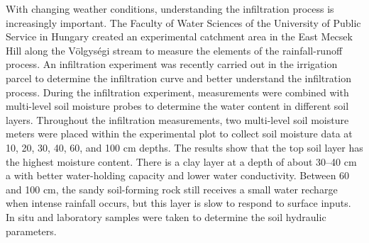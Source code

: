 

\newpage{}
{}
\begin{flushleft}







\end{flushleft}

\noindent

With changing weather conditions, understanding the infiltration process is increasingly important. The Faculty of Water Sciences of the University of Public Service in Hungary created an experimental catchment area in the East Mecsek Hill along the Völgységi stream to measure the elements of the rainfall-runoff process. An infiltration experiment was recently carried out in the irrigation parcel to determine the infiltration curve and better understand the infiltration process. During the infiltration experiment, measurements were combined with multi-level soil moisture probes to determine the water content in different soil layers. Throughout the infiltration measurements, two multi-level soil moisture meters were placed within the experimental plot to collect soil moisture data at 10, 20, 30, 40, 60, and 100 cm depths. The results show that the top soil layer has the highest moisture content. There is a clay layer at a depth of about 30–40 cm a with better water-holding capacity and lower water conductivity. Between 60 and 100 cm, the sandy soil-forming rock still receives a small water recharge when intense rainfall occurs, but this layer is slow to respond to surface inputs. In situ and laboratory samples were taken to determine the soil hydraulic parameters.

